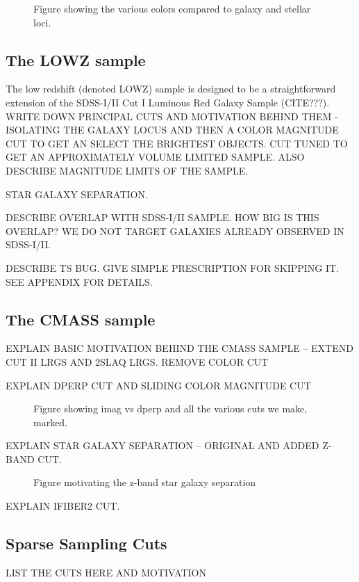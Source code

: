 \documentclass[preprint]{aastex}
\begin{document}
\begin{figure}
\caption{Figure showing the various colors compared to galaxy and stellar loci.}
\label{fig:color}
\end{figure}

\subsection{The LOWZ sample}

The low redshift (denoted LOWZ) sample is designed to be a straightforward
extension of the SDSS-I/II Cut I Luminous Red Galaxy Sample (CITE???).
WRITE DOWN PRINCIPAL CUTS AND MOTIVATION BEHIND THEM - ISOLATING THE GALAXY
LOCUS AND THEN A COLOR MAGNITUDE CUT TO GET AN SELECT THE BRIGHTEST OBJECTS. 
CUT TUNED TO GET AN APPROXIMATELY VOLUME LIMITED SAMPLE. ALSO DESCRIBE MAGNITUDE
LIMITS OF THE SAMPLE.

STAR GALAXY SEPARATION.

DESCRIBE OVERLAP WITH SDSS-I/II SAMPLE. HOW BIG IS THIS OVERLAP? WE DO NOT
TARGET GALAXIES ALREADY OBSERVED IN SDSS-I/II.

DESCRIBE TS BUG. GIVE SIMPLE PRESCRIPTION FOR SKIPPING IT. SEE APPENDIX FOR
DETAILS.

\subsection{The CMASS sample}

EXPLAIN BASIC MOTIVATION BEHIND THE CMASS SAMPLE -- EXTEND CUT II LRGS AND 2SLAQ
LRGS. REMOVE COLOR CUT

EXPLAIN DPERP CUT AND SLIDING COLOR MAGNITUDE CUT

\begin{figure}
\caption{Figure showing imag vs dperp and all the various cuts we make, marked.}
\end{figure}

EXPLAIN STAR GALAXY SEPARATION -- ORIGINAL AND ADDED Z-BAND CUT.

\begin{figure}
\caption{Figure motivating the z-band star galaxy separation}
\end{figure}

EXPLAIN IFIBER2 CUT.

\subsection{Sparse Sampling Cuts}

LIST THE CUTS HERE AND MOTIVATION
\end{document}
